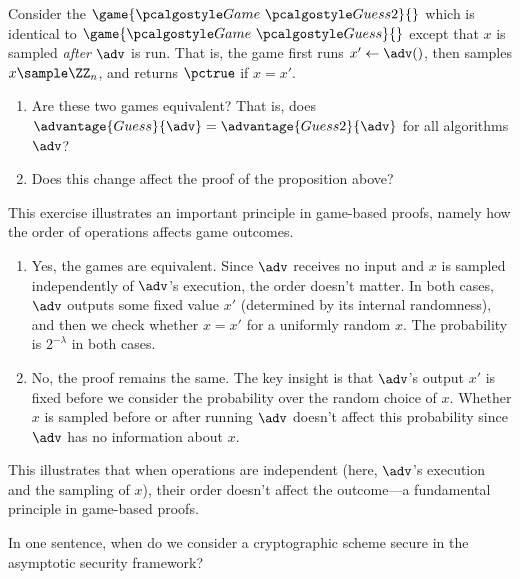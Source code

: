 \begin{exercise}\label{ex:guessing-game-equivalence}
  Consider the $\game{\Game~\algo{Guess2}}{}$ which is identical to $\game{\Game~\algo{Guess}}{}$ except that $x$ is sampled \emph{after} $\adv$ is run.
  That is, the game first runs $x' \gets \adv()$, then samples $x \sample \ZZ_n$, and returns $\pctrue$ if $x = x'$.
  \begin{enumerate}
    \item Are these two games equivalent? That is, does $\advantage{Guess}{\adv} = \advantage{Guess2}{\adv}$ for all algorithms $\adv$?
    \item Does this change affect the proof of the proposition above?
  \end{enumerate}
  
  This exercise illustrates an important principle in game-based proofs, namely how the order of operations affects game outcomes.
\end{exercise}

\ifsolutions
\begin{mysolution}
  \begin{enumerate}
    \item Yes, the games are equivalent.
    Since $\adv$ receives no input and $x$ is sampled independently of $\adv$'s execution, the order doesn't matter.
    In both cases, $\adv$ outputs some fixed value $x'$ (determined by its internal randomness), and then we check whether $x = x'$ for a uniformly random $x$.
    The probability is $2^{-\lambda}$ in both cases.
    
    \item No, the proof remains the same.
    The key insight is that $\adv$'s output $x'$ is fixed before we consider the probability over the random choice of $x$.
    Whether $x$ is sampled before or after running $\adv$ doesn't affect this probability since $\adv$ has no information about $x$.
  \end{enumerate}
  
  This illustrates that when operations are independent (here, $\adv$'s execution and the sampling of $x$), their order doesn't affect the outcome—a fundamental principle in game-based proofs.
\end{mysolution}
\fi

\begin{exercise}\label{ex:asymptotic-security}
  In one sentence, when do we consider a cryptographic scheme secure in the asymptotic security framework?
\end{exercise}

